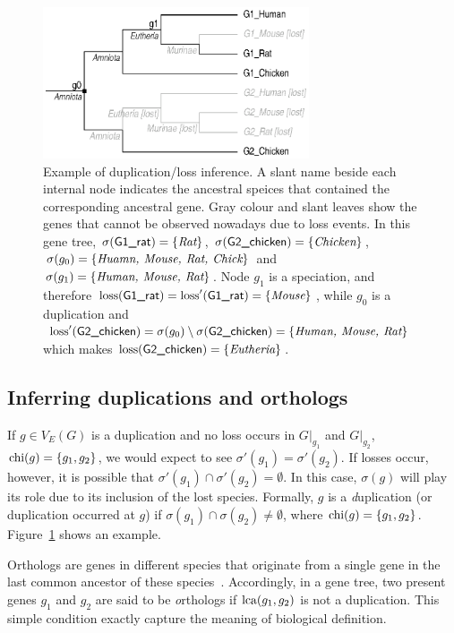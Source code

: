 \begin{figure}[!hb]
\begin{center}
\includegraphics[width=0.7\textwidth]{dli-exa}
\caption[Example of duplication/loss inference]
	{Example of duplication/loss inference. A slant name beside each internal node
	indicates the ancestral speices that contained the corresponding ancestral gene.
	Gray colour and slant leaves show the genes that cannot be observed nowadays due to loss events.
	In this gene tree, $\sigma(\mbox{\sf G1\_rat})=\{\mbox{\it Rat}\}$, $\sigma(\mbox{\sf G2\_chicken})=\{\mbox{\it Chicken}\}$,
	$\sigma(g_0)=\{\mbox{\it Huamn, Mouse, Rat, Chick}\}$ and $\sigma(g_1)=\{\mbox{\it Human, Mouse, Rat}\}$.
	Node $g_1$ is a speciation, and therefore $\mathrm{loss}(\mbox{\sf G1\_rat})=\mathrm{loss}'(\mbox{\sf G1\_rat})=\{\mbox{\it Mouse}\}$, while
	$g_0$ is a duplication and
	$\mathrm{loss}'(\mbox{\sf G2\_chicken})=\sigma(g_0)\setminus\sigma(\mbox{\sf G2\_chicken})=\{\mbox{\it Human, Mouse, Rat}\}$
	which makes $\mathrm{loss}(\mbox{\sf G2\_chicken})=\{\mbox{\it Eutheria}\}$.}\label{fig:dli-exa}
\end{center}
\end{figure}

\subsection{Inferring duplications and orthologs}

If $g\in V_E(G)$ is a duplication and no loss occurs in $G|_{g_1}$ and $G|_{g_2}$,
$\mathrm{chi}(g)=\{g_1,g_2\}$, we would expect to see $\sigma'(g_1)=\sigma'(g_2)$.
If losses occur, however, it is possible that $\sigma'(g_1)\cap\sigma'(g_2)=\emptyset$.
In this case, $\sigma(g)$ will play its role due to its inclusion of the lost species.
Formally, $g$ is a {\emph duplication} (or duplication occurred at $g$) if
$\sigma(g_1)\cap\sigma(g_2)\neq\emptyset$, where $\mathrm{chi}(g)=\{g_1,g_2\}$. Figure~\ref{fig:dli-exa}
shows an example.

Orthologs are genes in different species that originate from a single gene in the last
common ancestor of these species~\cite{remm01}. Accordingly, in a gene tree, two present genes $g_1$ and
$g_2$ are said to be {\emph orthologs} if $\mathrm{lca}(g_1,g_2)$ is not a duplication.
This simple condition exactly capture the meaning of biological definition.


